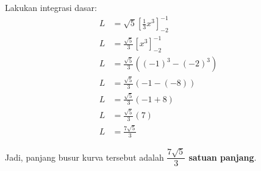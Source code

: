 \documentclass[12pt,a4paper]{article}
\begin{document}
Lakukan integrasi dasar:
\begin{align*}
  L &= \sqrt{5} \left[ \frac{1}{3}x^3 \right]_{-2}^{-1} \\
  L &= \frac{\sqrt{5}}{3} \left[ x^3 \right]_{-2}^{-1} \\
  L &= \frac{\sqrt{5}}{3} \left( (-1)^3 - (-2)^3 \right) \\
  L &= \frac{\sqrt{5}}{3} \left( -1 - (-8) \right) \\
  L &= \frac{\sqrt{5}}{3} \left( -1 + 8 \right) \\
  L &= \frac{\sqrt{5}}{3} (7) \\
  L &= \frac{7\sqrt{5}}{3}
\end{align*}

Jadi, panjang busur kurva tersebut adalah \textbf{$\dfrac{7\sqrt{5}}{3}$ satuan panjang}.
\end{document}
